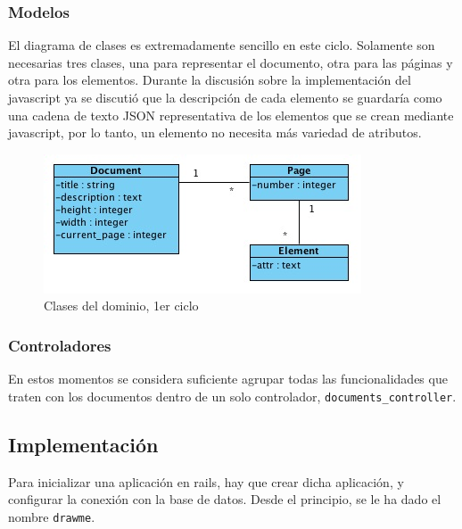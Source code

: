 \subsubsection{Modelos} %
\label{ssub:modelos}

El diagrama de clases es extremadamente sencillo en este ciclo. Solamente son necesarias tres clases, una para representar el documento, otra para las páginas y otra para los elementos. Durante la discusión sobre la implementación del javascript ya se discutió que la descripción de cada elemento se guardaría como una cadena de texto JSON representativa de los elementos que se crean mediante javascript, por lo tanto, un elemento no necesita más variedad de atributos.

\begin{figure}[h!]
\centering
\includegraphics{uml1.png}
\caption{Clases del dominio, 1er ciclo}\label{fig:uml1}
\end{figure}



\subsubsection{Controladores} %
\label{ssub:controladores}

En estos momentos se considera suficiente agrupar todas las funcionalidades que traten con los documentos dentro de un solo controlador, \texttt{documents\_controller}. 



\subsection{Implementación} %
\label{sub:implementacion}

Para inicializar una aplicación en rails, hay que crear dicha aplicación, y configurar la conexión con la base de datos. Desde el principio, se le ha dado el nombre \texttt{drawme}. 

